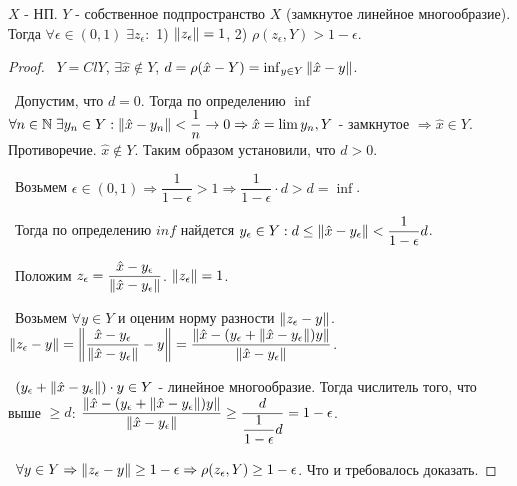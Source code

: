 \begin{theorem*}
   $X$ - НП. $Y$ - собственное подпространство $X$ (замкнутое линейное многообразие). Тогда $\forall \epsilon \in (0, 1) \; \exists z_\epsilon :$ 1) $\left\lVert z_\epsilon\right\rVert = 1$, 2) $\rho(z_\epsilon, Y) > 1 - \epsilon$.
\end{theorem*}
\begin{proof}

\noindent \textbullet~$Y = Cl Y$, $\exists \hat{x} \notin Y$, $d = \rho(\hat{x} - Y) = \inf_{y \in Y} \left\lVert\hat{x} - y\right\rVert$.

\smallskip 
\noindent \textbullet~Допустим, что $d = 0$. Тогда по определению $\inf$ $\forall n \in \mathbb{N} \; \exists y_n \in Y : \left\lVert\hat{x} - y_n\right\rVert < \dfrac{1}{n} \rightarrow 0 \Rightarrow \hat{x} = \lim y_n, Y$ - замкнутое $\Rightarrow \hat{x} \in Y$. Противоречие. $\hat{x} \notin Y$. Таким образом установили, что $d > 0$.

\smallskip 
\noindent \textbullet~Возьмем $\epsilon \in (0, 1) \Rightarrow \dfrac{1}{1 - \epsilon} > 1 \Rightarrow \dfrac{1}{1 - \epsilon} \cdot d > d = \inf$.

\smallskip 
\noindent \textbullet~Тогда по определению $inf$ найдется $y_\epsilon \in Y : d \le \left\lVert\hat{x} - y_{\epsilon}\right\rVert < \dfrac{1}{1 - \epsilon} d$.

\smallskip 
\noindent \textbullet~Положим $z_\epsilon = \dfrac{\hat{x} - y_\epsilon}{\left\lVert\hat{x} - y_\epsilon\right\rVert}$. $\left\lVert z_\epsilon\right\rVert = 1$.

\smallskip 
\noindent \textbullet~Возьмем $\forall y \in Y$ и оценим норму разности $\left\lVert z_\epsilon - y\right\rVert$. $\left\lVert z_\epsilon - y\right\rVert = \left\lVert\dfrac{\hat{x} - y_\epsilon}{\left\lVert\hat{x} - y_\epsilon\right\rVert} - y\right\rVert = \dfrac{\left\lVert\hat{x} - (y_\epsilon + \left\lVert\hat{x} - y_\epsilon\right\rVert) y\right\rVert}{\left\lVert\hat{x} - y_\epsilon\right\rVert}$.

\smallskip
\noindent \textbullet~$(y_\epsilon + \left\lVert\hat{x} - y_\epsilon\right\rVert)\cdot y \in Y$ - линейное многообразие. Тогда числитель того, что выше $\ge d$: $\dfrac{\left\lVert\hat{x} - (y_\epsilon + \left\lVert\hat{x} - y_\epsilon\right\rVert) y\right\rVert}{\left\lVert\hat{x} - y_\epsilon\right\rVert} \ge \dfrac{d}{\dfrac{1}{1- \epsilon} d} = 1 - \epsilon$.

\smallskip
\noindent \textbullet~$\forall y \in Y \Rightarrow \left\lVert z_\epsilon - y\right\rVert \ge 1 - \epsilon \Rightarrow \rho(z_\epsilon, Y) \ge 1 - \epsilon$. Что и требовалось доказать.
\end{proof}

